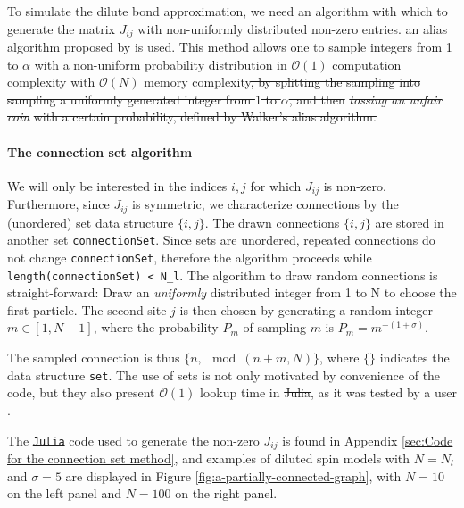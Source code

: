 \documentclass[a4paper]{article}
\providecommand{\DIFaddtex}[1]{{\protect\color{blue}\uwave{#1}}} %
\providecommand{\DIFdeltex}[1]{{\protect\color{red}\sout{#1}}}                      %
\providecommand{\DIFaddbegin}{} %
\providecommand{\DIFaddend}{} %
\providecommand{\DIFdelbegin}{} %
\providecommand{\DIFdelend}{} %
\providecommand{\DIFadd}[1]{\texorpdfstring{\DIFaddtex{#1}}{#1}} %
\providecommand{\DIFdel}[1]{\texorpdfstring{\DIFdeltex{#1}}{}} %
\newcommand{\DIFscaledelfig}{0.5}
\newlength{\DIFdelgraphicswidth} %
\newlength{\DIFdelgraphicsheight} %
\newcommand{\DIFaddincludegraphics}[2][]{{\color{blue}\fbox{\DIFOincludegraphics[#1]{#2}}}} %
\newcommand{\DIFdelincludegraphics}[2][]{%
\sbox{\DIFdelgraphicsbox}{\DIFOincludegraphics[#1]{#2}}%
\settoboxwidth{\DIFdelgraphicswidth}{\DIFdelgraphicsbox} %
\settoboxtotalheight{\DIFdelgraphicsheight}{\DIFdelgraphicsbox} %
\scalebox{\DIFscaledelfig}{%
\parbox[b]{\DIFdelgraphicswidth}{\usebox{\DIFdelgraphicsbox}\\[-\baselineskip] \rule{\DIFdelgraphicswidth}{0em}}\llap{\resizebox{\DIFdelgraphicswidth}{\DIFdelgraphicsheight}{%
\setlength{\unitlength}{\DIFdelgraphicswidth}%
\begin{picture}(1,1)%
\thicklines\linethickness{2pt} %
{\color[rgb]{1,0,0}\put(0,0){\framebox(1,1){}}}%
{\color[rgb]{1,0,0}\put(0,0){\line( 1,1){1}}}%
{\color[rgb]{1,0,0}\put(0,1){\line(1,-1){1}}}%
\end{picture}%
}\hspace*{3pt}}} %
} %
\DeclareRobustCommand{\DIFaddbegin}{\DIFOaddbegin \let\includegraphics\DIFaddincludegraphics} %
\DeclareRobustCommand{\DIFaddend}{\DIFOaddend \let\includegraphics\DIFOincludegraphics} %
\DeclareRobustCommand{\DIFdelbegin}{\DIFOdelbegin \let\includegraphics\DIFdelincludegraphics} %
\DeclareRobustCommand{\DIFdelend}{\DIFOaddend \let\includegraphics\DIFOincludegraphics} %
\begin{document}
To simulate the dilute bond approximation, we need an algorithm with which to generate the matrix $J_{ij}$ with non-uniformly distributed non-zero entries.
an alias algorithm proposed by \cite{Walker1974} is used. This method allows one to sample integers from 1 to $\alpha$ with a non-uniform probability distribution in $\mathcal{O}(1)$ computation complexity with $\mathcal{O}(N)$ memory complexity\DIFdelbegin \DIFdel{, by splitting the sampling into sampling a uniformly generated integer from $1$ to  $\alpha$, and then }\textit{\DIFdel{tossing an unfair coin}} %
\DIFdel{with a certain probability, defined by Walker's alias algorithm. 
}\DIFdelend \DIFaddbegin \DIFadd{. 
}\DIFaddend 

\paragraph{The connection set algorithm}%
\label{sub:The connection set algorithm}

We will only be interested in the indices $i, j$ for which  $J_{ij}$ is non-zero. Furthermore, since $J_{ij}$ is symmetric, we characterize connections by the (unordered) set data structure $\{i, j\}$.
The drawn connections $\{ i, j \} $ are stored in another set \texttt{connectionSet}. Since sets are unordered, repeated connections do not change \texttt{connectionSet}, therefore the algorithm proceeds while \texttt{length(connectionSet) < N\_l}. The algorithm to draw random connections is straight-forward: Draw an \textit{uniformly} distributed integer from 1 to N to choose the first particle. The second site $j$ is then chosen by generating a random integer $m \in [1, N-1]$, where the probability $P_m$ of sampling $m$ is  \DIFdelbegin \DIFdel{$P_m = m^{-(1+\sigma)}$}\DIFdelend \DIFaddbegin \DIFadd{$P_m = \min(m, \floor{\frac{N}{2}, N - m})^{-(1+\sigma)}$}\DIFaddend . 

The sampled connection is thus $\{n, \mod(n+m, N)\}$, where $\{\}$ indicates the data structure \texttt{set}. 
The use of sets is not only motivated by convenience of the code, but they also present $\mathcal{O}(1)$ lookup time in \DIFdelbegin \DIFdel{Julia}\DIFdelend \DIFaddbegin \texttt{\DIFadd{julia}}\DIFaddend , as it was tested by a user \cite{setTime}.

The \texttt{\DIFdelbegin \DIFdel{Julia}\DIFdelend \DIFaddbegin \DIFadd{julia}\DIFaddend } code used to generate the non-zero $J_{ij}$ is found in Appendix \ref{sec:Code for the connection set method}, and examples of diluted spin models with $N=N_l$ and $\sigma = 5$ are displayed in Figure \ref{fig:a-partially-connected-graph}, with $N=10$ on the left panel and $N=100$ on the right panel.
\end{document}
